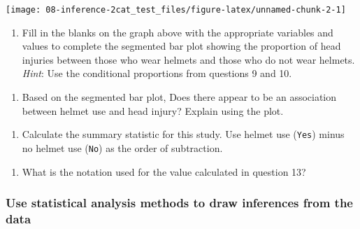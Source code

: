 \documentclass[
]{report}
\providecommand{\tightlist}{%
  \setlength{\itemsep}{0pt}\setlength{\parskip}{0pt}}
\begin{document}
\vspace{.3in}

\begin{center}\texttt{[image: 08-inference-2cat\_test\_files/figure-latex/unnamed-chunk-2-1]} \end{center}

\begin{enumerate}
\def\labelenumi{\arabic{enumi}.}
\setcounter{enumi}{10}
\tightlist
\item
  Fill in the blanks on the graph above with the appropriate variables and values to complete the segmented bar plot showing the proportion of head injuries between those who wear helmets and those who do not wear helmets. \emph{Hint}: Use the conditional proportions from questions 9 and 10.
\end{enumerate}

\vspace{1mm}

\begin{enumerate}
\def\labelenumi{\arabic{enumi}.}
\setcounter{enumi}{11}
\tightlist
\item
  Based on the segmented bar plot, Does there appear to be an association between helmet use and head injury? Explain using the plot.
\end{enumerate}

\vspace{0.7in}

\begin{enumerate}
\def\labelenumi{\arabic{enumi}.}
\setcounter{enumi}{12}
\tightlist
\item
  Calculate the summary statistic for this study. Use helmet use (\texttt{Yes}) minus no helmet use (\texttt{No}) as the order of subtraction.
\end{enumerate}

\vspace{0.5in}

\begin{enumerate}
\def\labelenumi{\arabic{enumi}.}
\setcounter{enumi}{13}
\tightlist
\item
  What is the notation used for the value calculated in question 13?
\end{enumerate}

\vspace{0.2in}
\newpage

\hypertarget{use-statistical-analysis-methods-to-draw-inferences-from-the-data-2}{%
\subsubsection*{Use statistical analysis methods to draw inferences from the data}\label{use-statistical-analysis-methods-to-draw-inferences-from-the-data-2}}
\end{document}
